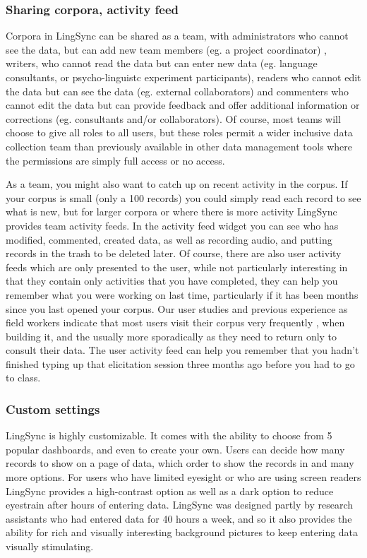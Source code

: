 \documentclass[letterpaper, 12pt, dvips]{mitwpl}
\begin{document}
\subsubsection{Sharing corpora, activity feed}
\label{sec:sharingactivityfeeds}

Corpora in LingSync can be shared as a team, with administrators who cannot see the data, but can add new team members (eg. a project coordinator) , writers, who cannot read the data but can enter new data (eg. language consultants, or psycho-linguistc experiment participants), readers who cannot edit the data but can see the data (eg. external collaborators) and commenters  who cannot edit the data but can provide feedback and offer additional information or corrections (eg. consultants and/or collaborators).  Of course, most teams will choose to give all roles to all users, but these roles permit a wider inclusive data collection team than previously available  in other data management tools where the permissions are simply full access or no access.

As a team, you might also want to catch up on recent activity in the corpus. If your corpus is small (only a 100 records) you could simply read each record to see what is new, but for larger corpora or where there is more activity LingSync provides team activity feeds. In the activity feed widget you can see who has modified, commented, created data, as well as recording audio, and putting records in the trash to be deleted later. Of course, there are also user activity feeds which are only presented to the user, while not particularly interesting in that they contain only activities that you have completed, they can help you remember what you were working on last time, particularly if it has been months since you last opened your corpus. Our user studies and previous experience as field workers indicate that most users visit their corpus very frequently , when building it, and the usually more sporadically as they need to return only to consult their data. The user activity feed can help you remember that you hadn't finished typing up that elicitation session three months ago before you had to go to class. 

\subsubsection{Custom settings}

LingSync is highly customizable. It comes with the ability to choose from 5 popular dashboards, and even to create your own. Users can decide how many records to show on a page of data, which order to show the records in and many more options. For users who have limited eyesight or who are using screen readers LingSync provides a high-contrast option as well as a dark option to reduce eyestrain after hours of entering data. LingSync was designed partly by research assistants who had entered data for 40 hours a week, and so it also provides the ability for rich and visually interesting background pictures to keep entering data visually stimulating.
\end{document}
